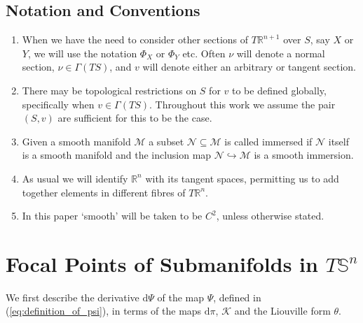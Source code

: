 \documentclass[12pt]{amsart}
\theoremstyle{plain}
\theoremstyle{definition}
\def\R{\mathbb{R}}
\def\S{\mathbb{S}}
\newcommand{\td}{\mathrm{d}}
\numberwithin{equation}{section}
\begin{document}
\subsection{Notation and Conventions}
\begin{enumerate}[label=\arabic*.]
    \item When we have the need to consider other sections of $T\R^{n+1}$ over $S$, say $X$ or $Y$, we will use the notation $\Phi_X$ or $\Phi_{Y}$ etc. Often $\nu$ will denote a normal section, $\nu\in\Gamma(TS)$, and $v$ will denote either an arbitrary or tangent section.
    \item There may be topological restrictions on $S$ for $v$ to be defined globally, specifically when $v\in\Gamma(TS)$. Throughout this work we assume the pair $(S,v)$ are sufficient for this to be the case. 
    \item Given a smooth manifold $\mathcal{M}$ a subset $\mathcal{N}\subseteq\mathcal{M}$ is called immersed if $\mathcal{N}$ itself is a smooth manifold and the inclusion map $\mathcal{N}\hookrightarrow\mathcal{M}$ is a smooth immersion.
    \item As usual we will identify $\mathbb{R}^n$ with its tangent spaces, permitting us to add together elements in different fibres of $T\mathbb{R}^{n}$.
    \item In this paper `smooth' will be taken to be $C^{2}$, unless otherwise stated.
\end{enumerate}
\section{Focal Points of Submanifolds in \texorpdfstring{$T\S^n$}{TSn}}
\label{sec:focal sets}
We first describe the derivative $\td\Psi$ of the map $\Psi$, defined in (\ref{eq:definition_of_psi}), in terms of the maps $\td \pi$, $\mathcal{K}$ and the Liouville form $\theta$. 
\end{document}
